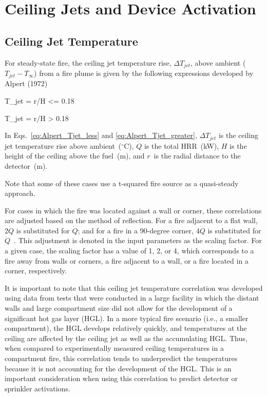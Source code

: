 \chapter{Ceiling Jets and Device Activation}
\label{Ceiling_Jet_Chapter}

\section{Ceiling Jet Temperature}

For steady-state fire, the ceiling jet temperature rise, $\Delta T_{jet}$, above ambient ($T_{jet} - T_\infty$) from a fire plume is given by the following expressions developed by Alpert (1972)

\be
\Delta T_{jet} =   r/H <= 0.18
\label{eq:Alpert_Tjet_less}
\ee

\be
\Delta T_{jet} =   r/H > 0.18
\label{eq:Alpert_Tjet_greater}
\ee

In Eqs.~\ref{eq:Alpert_Tjet_less} and \ref{eq:Alpert_Tjet_greater}, $\Delta T_{jet}$ is the ceiling jet temperature rise above ambient~($^\circ$C), $\dot Q$ is the total HRR~(kW), $H$ is the height of the ceiling above the fuel~(m), and $r$~is the radial distance to the detector~(m).

Note that some of these cases use a t-squared fire source as a quasi-steady approach.

For cases in which the fire was located against a wall or corner, these correlations are adjusted based on the method of reflection. For a fire adjacent to a flat wall, 2$\dot Q$ is substituted for $\dot Q$; and for a fire in a 90-degree corner, 4$\dot Q$ is substituted for $\dot Q$~\cite{SFPE:Alpert}. This adjustment is denoted in the input parameters as the scaling factor. For a given case, the scaling factor has a value of 1, 2, or 4, which corresponds to a fire away from walls or corners, a fire adjacent to a wall, or a fire located in a corner, respectively.

It is important to note that this ceiling jet temperature correlation was developed using data from tests that were conducted in a large facility in which the distant walls and large compartment size did not allow for the development of a significant hot gas layer (HGL). In a more typical fire scenario (i.e., a smaller compartment), the HGL develops relatively quickly, and temperatures at the ceiling are affected by the ceiling jet as well as the accumulating HGL. Thus, when compared to experimentally measured ceiling temperatures in a compartment fire, this correlation tends to underpredict the temperatures because it is not accounting for the development of the HGL. This is an important consideration when using this correlation to predict detector or sprinkler activations.

